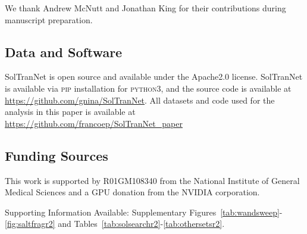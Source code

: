 \documentclass[journal=jcim,manuscript=applicationnotes]{achemso}
\begin{document}
\begin{acknowledgement}

We thank Andrew McNutt and Jonathan King for their contributions during manuscript preparation.

\subsection{Data and Software}
SolTranNet is open source and available under the Apache2.0 license. SolTranNet is available via \textsc{pip} installation for \textsc{python3}, and the source code is available at \url{https://github.com/gnina/SolTranNet}. All datasets and code used for the analysis in this paper is available at \url{https://github.com/francoep/SolTranNet_paper}

\subsection{Funding Sources}
This work is supported by R01GM108340 from the National Institute of General Medical Sciences and a GPU donation from the NVIDIA corporation.

\end{acknowledgement}

\begin{suppinfo}

Supporting Information Available: Supplementary Figures~\ref{tab:wandsweep}-\ref{fig:saltfragr2} and Tables~\ref{tab:solsearchr2}-\ref{tab:othersetsr2}.
\end{suppinfo}


\end{document}
